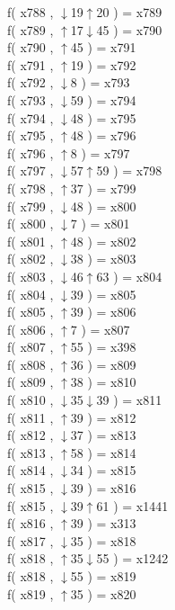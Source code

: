 f( x788 , $\downarrow$19$\uparrow$20 ) = x789 \\
f( x789 , $\uparrow$17$\downarrow$45 ) = x790 \\
f( x790 , $\uparrow$45 ) = x791 \\
f( x791 , $\uparrow$19 ) = x792 \\
f( x792 , $\downarrow$8 ) = x793 \\
f( x793 , $\downarrow$59 ) = x794 \\
f( x794 , $\downarrow$48 ) = x795 \\
f( x795 , $\uparrow$48 ) = x796 \\
f( x796 , $\uparrow$8 ) = x797 \\
f( x797 , $\downarrow$57$\uparrow$59 ) = x798 \\
f( x798 , $\uparrow$37 ) = x799 \\
f( x799 , $\downarrow$48 ) = x800 \\
f( x800 , $\downarrow$7 ) = x801 \\
f( x801 , $\uparrow$48 ) = x802 \\
f( x802 , $\downarrow$38 ) = x803 \\
f( x803 , $\downarrow$46$\uparrow$63 ) = x804 \\
f( x804 , $\downarrow$39 ) = x805 \\
f( x805 , $\uparrow$39 ) = x806 \\
f( x806 , $\uparrow$7 ) = x807 \\
f( x807 , $\uparrow$55 ) = x398 \\
f( x808 , $\uparrow$36 ) = x809 \\
f( x809 , $\uparrow$38 ) = x810 \\
f( x810 , $\downarrow$35$\downarrow$39 ) = x811 \\
f( x811 , $\uparrow$39 ) = x812 \\
f( x812 , $\downarrow$37 ) = x813 \\
f( x813 , $\uparrow$58 ) = x814 \\
f( x814 , $\downarrow$34 ) = x815 \\
f( x815 , $\downarrow$39 ) = x816 \\
f( x815 , $\downarrow$39$\uparrow$61 ) = x1441 \\
f( x816 , $\uparrow$39 ) = x313 \\
f( x817 , $\downarrow$35 ) = x818 \\
f( x818 , $\uparrow$35$\downarrow$55 ) = x1242 \\
f( x818 , $\downarrow$55 ) = x819 \\
f( x819 , $\uparrow$35 ) = x820 \\
